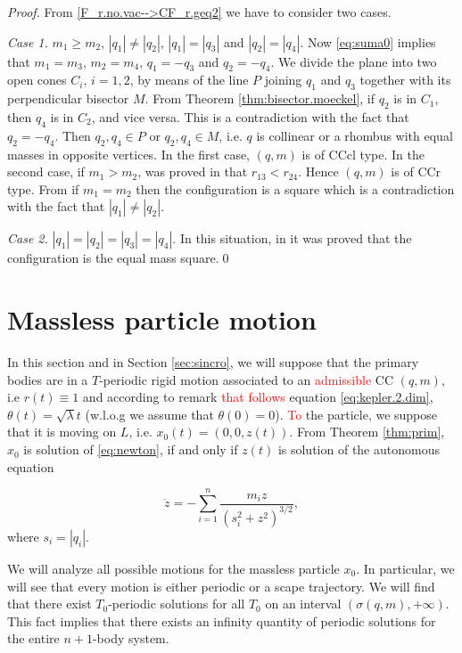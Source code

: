 \documentclass[smallcondensed]{svjour3}
\begin{document}
\begin{proof}
From \eqref{F_r.no.vac-->CF_r.geq2} we have to consider two cases.

\emph{Case 1.}  $m_1\geq m_2$, $|q_1|\neq|q_2|$, $|q_1|=|q_3|$ and $|q_2|=|q_4|$. Now \eqref{eq:suma0} implies that
 $m_1=m_3$, $m_2=m_4$, $q_1=-q_3$ and $q_2=-q_4$.  We divide the plane into two open cones $C_i$, $i=1,2$, by means of  the line $P$ joining $q_1$  and $q_3$ together with its perpendicular bisector $M$.  From Theorem \ref{thm:bisector.moeckel}, if  $q_2$  is in $C_1$, then  $q_4$ is in $C_2$, and vice versa. This is a contradiction with the fact that $q_2=-q_4$. Then $q_2,q_4\in P$ or $q_2,q_4\in M$, i.e. $q$ is collinear or a rhombus with equal masses in opposite vertices. In the first case, $(q,m)$ is of  CCcl type. In the second case, if $m_1>m_2$,   was proved in \cite[Eqs. $(3.44)$ and $(3.45)$]{long2002four} that $r_{13}<r_{24}$. Hence $(q,m)$ is of  CCr type. From \cite[Corollary 2]{perez2007convex} if $m_1=m_2$ then the configuration is a square which is a contradiction with the fact that $|q_1|\neq|q_2|$.

\emph{Case 2.} $|q_1|=|q_2|=|q_3|=|q_4|$. In this situation,   in \cite{hampton2005co} it was proved that the configuration is the equal mass square.\qed
\end{proof}

\section{Massless particle motion}\label{sec:mas-mot}

In this section and in Section \ref{sec:sincro},  we will suppose that the primary bodies are in a $T$-periodic rigid motion associated to an \textcolor{red}{admissible}  CC $(q,m)$, i.e  $r(t)\equiv 1$ and according to remark \textcolor{red}{that follows} equation \eqref{eq:kepler.2.dim}, $\theta (t)=\sqrt{\lambda}t$  (w.l.o.g  we  assume that $\theta(0)=0$). \textcolor{red}{To} the particle, we suppose that it is moving on $L$, i.e. $x_0(t)=(0,0,z(t))$. From Theorem \ref{thm:prim}, $x_0$ is solution of \eqref{eq:newton}, if and only if $z(t)$ is solution of the autonomous equation



\begin{equation}\label{eq:eq_new_red}
 \ddot{z}=-\sum_{i=1}^n\frac{m_iz}{(s_i^2+z^2)^{3/2}},
\end{equation}
where $s_i=|q_i|$.

We will analyze all possible motions for the massless particle $x_0$. In particular, we will see that every motion is either periodic or a scape trajectory. We will find that there exist $T_0$-periodic solutions for all $T_0$ on an interval  $(\sigma(q,m),+\infty)$. This fact implies that there exists an infinity quantity of periodic solutions for the entire $n+1$-body system.
\end{document}
